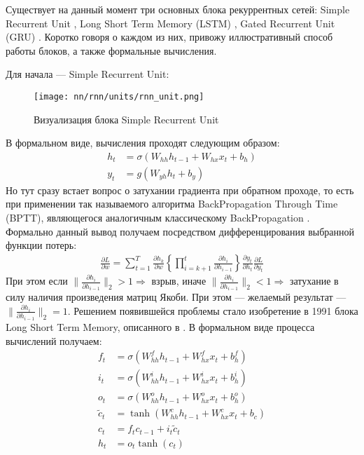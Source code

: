 Существует на данный момент три основных блока рекуррентных сетей: Simple Recurrent Unit \cite{rumelhart1986learning}, Long Short Term Memory (LSTM) \cite{hochreiter1997long}, Gated Recurrent Unit (GRU) \cite{cho2014learning}. Коротко говоря о каждом из них, привожу иллюстративный способ работы блоков, а также формальные вычисления.

Для начала --- Simple Recurrent Unit:
\begin{figure}[H]
	\centering
	\texttt{[image: nn/rnn/units/rnn\_unit.png]}
	\caption{Визуализация блока Simple Recurrent Unit}
	\label{fig::rnn_unit}
\end{figure}
\noindent В формальном виде, вычисления проходят следующим образом:
\begin{equation}
	\begin{split}
		h_t & = \sigma\left(W_{hh}h_{t - 1} + W_{hx} x_t + b_h\right)\\
		y_ t & = g\left(W_{yh}h_t + b_y\right)
	\end{split}
\end{equation}
Но тут сразу встает вопрос о затухании градиента при обратном проходе, то есть при применении так называемого алгоритма BackPropagation Through Time (BPTT), являющегося аналогичным классическому BackPropagation \cite{linnainmaa1970representation}. Формально данный вывод получаем посредством дифференцирования выбранной функции потерь:
\begin{equation}
	\begin{split}
		\frac{\partial L}{\partial w} = \sum_{t = 1}^T  \frac{\partial h_k}{\partial w} \left\{ \prod_{i = k + 1}^{t} \frac{\partial h_i}{\partial h_{i - 1}}\right\} \frac{\partial y_t}{\partial h_t} \frac{\partial L}{\partial y_t}
	\end{split}
\end{equation}
При этом если $\lVert \frac{\partial h_i}{\partial h_{i - 1}} \rVert_2 > 1 \Rightarrow$ взрыв, иначе $\lVert \frac{\partial h_i}{\partial h_{i - 1}} \rVert_2 < 1 \Rightarrow$ затухание в силу наличия произведения матриц Якоби. При этом --- желаемый результат --- $\lVert \frac{\partial h_i}{\partial h_{i - 1}} \rVert_2 = 1$. Решением появившейся проблемы стало изобретение в 1991 блока Long Short Term Memory, описанного в \cite{hochreiter1991untersuchungen, hochreiter1997long}. В формальном виде процесса вычислений получаем:
\begin{equation}
	\begin{split}
		f_t & = \sigma \left(W_{hh}^f h_{t - 1} + W_{hx}^f x_t + b_h^f\right)\\
		i_t & = \sigma \left(W_{hh}^i h_{t - 1} + W_{hx}^i x_t + b_h^i\right)\\
		o_t & = \sigma \left(W_{hh}^o h_{t - 1} + W_{hx}^o x_t + b_h^o\right)\\
		\tilde{c}_t & = \tanh\left(W_{hh}^c h_{t - 1} + W_{hx}^c x_t + b_c\right)\\
		c_t & = f_t c_{t - 1} + i_{t} \tilde{c}_t\\
		h_t & = o_t \tanh\left(c_t\right)
	\end{split}
\end{equation}
